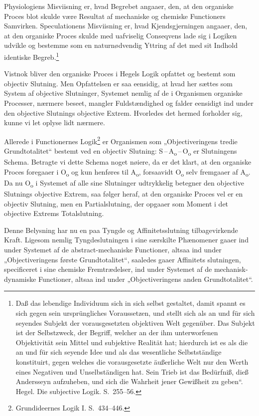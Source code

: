 \documentclass[12pt]{book}
\newcommand{\opage}[1]{\marginnote{\footnotesize\textit{[#1]}}}
\begin{document}
Physiologiens Misviisning er, hvad Begrebet angaaer, den, at den organiske Proces blot skulde være Resultat af mechaniske og chemiske Functioners Samvirken. Speculationens Misviisning er, hvad Kjendsgjerningen angaaer, den, at den organiske Proces skulde med uafviselig Conseqvens lade sig i Logiken udvikle og bestemme som en naturnødvendig Yttring af det med sit Indhold identiske Begreb.\footnote{Daß das lebendige Individuum sich in sich selbst gestaltet, damit spannt es sich gegen sein ursprüngliches Voraussetzen, und stellt sich %
als an und für sich seyendes Subjekt der vorausgesetzten objektiven Welt gegenüber. Das Subjekt ist der Selbstzweck, der Begriff, welcher an der ihm unterworfenen Objektivität sein Mittel und subjektive Realität hat; hierdurch ist es als die an und für sich seyende Idee und als das wesentliche Selbstständige konstituirt, gegen welches die vorausgesetzte äußerliche Welt nur den Werth eines Negativen und Unselbständigen hat. Sein Trieb ist das Bedürfniß, dieß Andersseyn aufzuheben, und sich die Wahrheit jener Gewißheit zu geben“. %
Hegel. Die subjective Logik. S.~255--56.}%

\opage{423}Vistnok bliver den organiske Proces i Hegels Logik opfattet og bestemt som objectiv Slutning. Men Opfattelsen er saa eensidig, at hvad her sættes som System af objective Slutninger, Systemet nemlig af de i Organismen organiske Processer, nærmere beseet, mangler Fuldstændighed og falder eensidigt ind under den objective Slutnings objective Extrem. Hvorledes det hermed forholder sig, kunne vi let oplyse lidt nærmere.

Allerede i Functionernes Logik\footnote{Grundideernes Logik I. S.~434--446.}%
{} er Organismen som „Objectiveringens tredie Grundtotalitet“ bestemt ved en objectiv Slutning: S\,--\,A\textsubscript{o}\,--\,O\textsubscript{o} er Slutningens Schema. Betragte vi dette Schema noget nøiere, da er det klart, at den organiske Proces foregaaer i O\textsubscript{o} og kun henføres til A\textsubscript{o}, forsaavidt O\textsubscript{o} selv fremgaaer af A\textsubscript{o}. Da nu O\textsubscript{o} i Systemet af alle sine Slutninger udtrykkelig betegner den objective Slutnings objective Extrem, saa følger heraf, at den organiske Proces vel er en objectiv Slutning, men en Partialslutning, der opgaaer som Moment i det objective Extrems Totalslutning.

Denne Belysning har nu en paa Tyngde og Affinitetsslutning tilbagevirkende Kraft. Ligesom nemlig Tyngdeslutningen i sine særskilte Phænomener gaaer ind under Systemet af de abstract-mechaniske Functioner, altsaa ind under „Objectiveringens første Grundtotalitet“, saaledes gaaer Affinitets%
\opage{424}slutningen, specificeret i sine chemiske Fremtrædelser, ind under Systemet af de mechanisk-dynamiske Functioner, altsaa ind under „Objectiveringens anden Grundtotalitet“.
\end{document}
